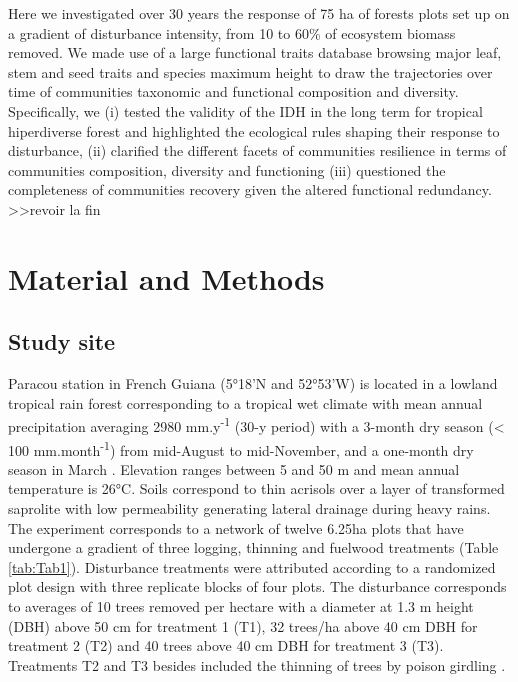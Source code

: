 \documentclass[fleqn,10pt]{ArtEcoFoG} %
\theoremstyle{definition}
\theoremstyle{definition}
\theoremstyle{definition}
\theoremstyle{remark}
\begin{document}
Here we investigated over 30 years the response of 75 ha of forests
plots set up on a gradient of disturbance intensity, from 10 to 60\% of
ecosystem biomass removed. We made use of a large functional traits
database browsing major leaf, stem and seed traits and species maximum
height to draw the trajectories over time of communities taxonomic and
functional composition and diversity. Specifically, we (i) tested the
validity of the IDH in the long term for tropical hiperdiverse forest
and highlighted the ecological rules shaping their response to
disturbance, (ii) clarified the different facets of communities
resilience in terms of communities composition, diversity and
functioning (iii) questioned the completeness of communities recovery
given the altered functional redundancy.
\textgreater{}\textgreater{}revoir la fin

\section{Material and Methods}\label{material-and-methods}

\subsection{Study site}\label{study-site}

Paracou station in French Guiana (5°18'N and 52°53'W) is located in a
lowland tropical rain forest corresponding to a tropical wet climate
with mean annual precipitation averaging 2980 mm.y\textsuperscript{-1}
(30-y period) with a 3-month dry season (\textless{} 100
mm.month\textsuperscript{-1}) from mid-August to mid-November, and a
one-month dry season in March \citep{Wagner2011}. Elevation ranges
between 5 and 50 m and mean annual temperature is 26°C. Soils correspond
to thin acrisols over a layer of transformed saprolite with low
permeability generating lateral drainage during heavy rains. The
experiment corresponds to a network of twelve 6.25ha plots that have
undergone a gradient of three logging, thinning and fuelwood treatments
(Table \ref{tab:Tab1}). Disturbance treatments were attributed according
to a randomized plot design with three replicate blocks of four plots.
The disturbance corresponds to averages of 10 trees removed per hectare
with a diameter at 1.3 m height (DBH) above 50 cm for treatment 1 (T1),
32 trees/ha above 40 cm DBH for treatment 2 (T2) and 40 trees above 40
cm DBH for treatment 3 (T3). Treatments T2 and T3 besides included the
thinning of trees by poison girdling \citep{Blanc2009}.
\end{document}
